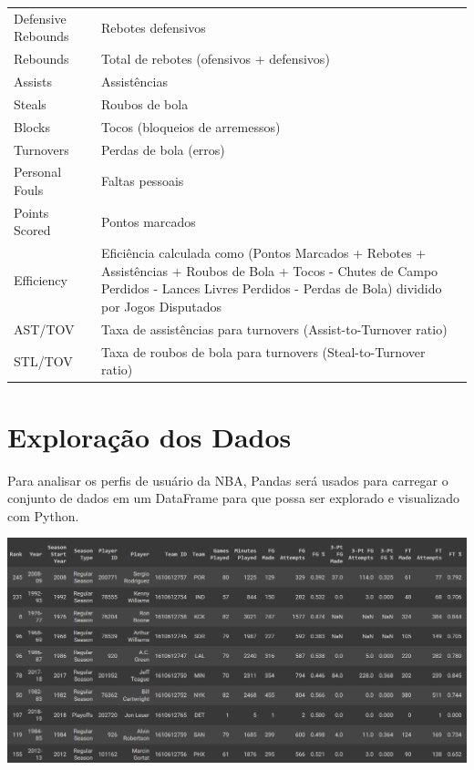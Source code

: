 \documentclass[
]{book}
\begin{document}
\begin{longtable}[]{@{}
  >{\raggedright\arraybackslash}p{}
  >{\raggedright\arraybackslash}p{}@{}}
Defensive Rebounds & Rebotes defensivos \\
Rebounds & Total de rebotes (ofensivos + defensivos) \\
Assists & Assistências \\
Steals & Roubos de bola \\
Blocks & Tocos (bloqueios de arremessos) \\
Turnovers & Perdas de bola (erros) \\
Personal Fouls & Faltas pessoais \\
Points Scored & Pontos marcados \\
Efficiency & Eficiência calculada como (Pontos Marcados + Rebotes + Assistências + Roubos de Bola + Tocos - Chutes de Campo Perdidos - Lances Livres Perdidos - Perdas de Bola) dividido por Jogos Disputados \\
AST/TOV & Taxa de assistências para turnovers (Assist-to-Turnover ratio) \\
STL/TOV & Taxa de roubos de bola para turnovers (Steal-to-Turnover ratio) \\
\bottomrule()
\end{longtable}

\hypertarget{explorauxe7uxe3o-dos-dados}{%
\chapter{Exploração dos Dados}\label{explorauxe7uxe3o-dos-dados}}

Para analisar os perfis de usuário da NBA, Pandas será usados para carregar o conjunto de dados em um DataFrame para que possa ser explorado e visualizado com Python.

\includegraphics{imagens/dataframe1.png}
\end{document}
